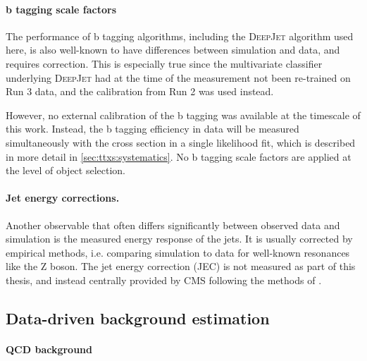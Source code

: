 
\paragraph{b tagging scale factors}

The performance of b tagging algorithms, including the \textsc{DeepJet} algorithm used here, is also well-known to have differences between simulation and data, and requires correction. This is especially true since the multivariate classifier underlying \textsc{DeepJet} had at the time of the measurement not been re-trained on Run 3 data, and the calibration from Run 2 was used instead.

However, no external calibration of the b tagging was available at the timescale of this work. Instead, the b tagging efficiency in data will be measured simultaneously with the \ttbar cross section in a single likelihood fit, which is described in more detail in \cref{sec:ttxs:systematics}. No b tagging scale factors are applied at the level of object selection.

\paragraph{Jet energy corrections.}

Another observable that often differs significantly between observed data and simulation is the measured energy response of the jets. It is usually corrected by empirical methods, i.e. comparing simulation to data for well-known resonances like the Z boson. The jet energy correction (JEC) is not measured as part of this thesis, and instead centrally provided by CMS following the methods of . 


\subsection{Data-driven background estimation}
\label{sec:ttxs:datadriven}

\paragraph{QCD background}

